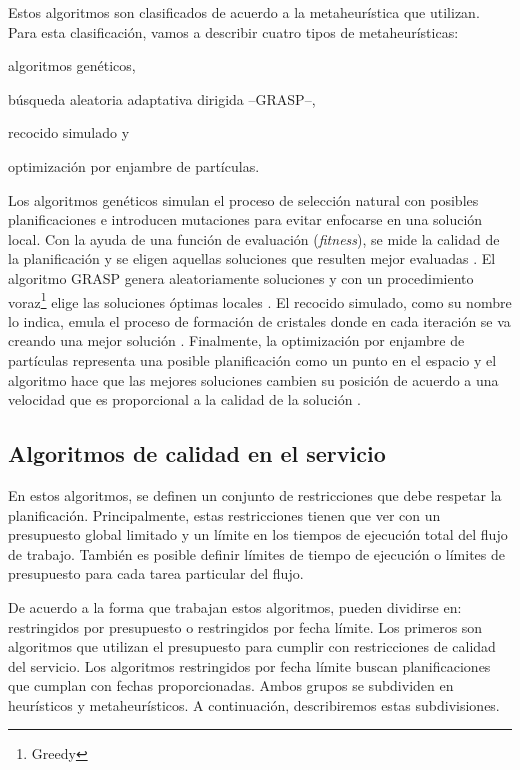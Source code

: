 Estos algoritmos son clasificados de acuerdo a la metaheurística que utilizan. Para esta clasificación, vamos a describir cuatro tipos de metaheurísticas: 
\begin{enumerate*}[label=\alph*)]
\item{algoritmos genéticos,}
\item{búsqueda aleatoria adaptativa dirigida --GRASP--,}
\item{recocido simulado y}
\item{optimización por enjambre de partículas.}
\end{enumerate*}

Los algoritmos genéticos simulan el proceso de selección natural con posibles planificaciones e introducen mutaciones para evitar enfocarse en una solución local. Con la ayuda de una función de evaluación (\emph{fitness}), se mide la calidad de la planificación y se eligen aquellas soluciones que resulten mejor evaluadas \cite{yu2006scheduling}. El algoritmo GRASP \cite{blythe2005task} genera aleatoriamente soluciones y con un procedimiento voraz\footnote{Greedy} elige las soluciones óptimas locales \cite{blythe2005task}. El recocido simulado, como su nombre lo indica, emula el proceso de formación de cristales donde en cada iteración se va creando una mejor solución \cite{young2003scheduling}. Finalmente, la optimización por enjambre de partículas representa una posible planificación como un punto en el espacio y el algoritmo hace que las mejores soluciones cambien su posición de acuerdo a una velocidad que es proporcional a la calidad de la solución \cite{wu2010revised}.


\subsection{Algoritmos de calidad en el servicio}

En estos algoritmos, se definen un conjunto de restricciones que debe respetar la planificación. Principalmente, estas restricciones tienen que ver con un presupuesto global limitado y un límite en los tiempos de ejecución total del flujo de trabajo. También es posible definir límites de tiempo de ejecución o límites de presupuesto para cada tarea particular del flujo.

De acuerdo a la forma que trabajan estos algoritmos, pueden dividirse en: restringidos por presupuesto o restringidos por fecha límite. Los primeros son algoritmos que utilizan el presupuesto para cumplir con restricciones de calidad del servicio. Los algoritmos restringidos por fecha límite buscan planificaciones que cumplan con fechas proporcionadas. Ambos grupos se subdividen en heurísticos y metaheurísticos. A continuación, describiremos estas subdivisiones.


